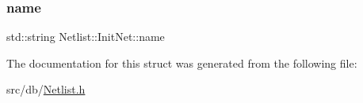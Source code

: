 \mbox{\label{structNetlist_1_1InitNet_acb4d378b948bc8e2cd1490f62683ed2d}} 
\subsubsection{\texorpdfstring{name}{name}}
{\footnotesize\ttfamily std\+::string Netlist\+::\+Init\+Net\+::name}



The documentation for this struct was generated from the following file\+:\begin{DoxyCompactItemize}
\item 
src/db/\hyperlink{Netlist_8h}{Netlist.\+h}\end{DoxyCompactItemize}
